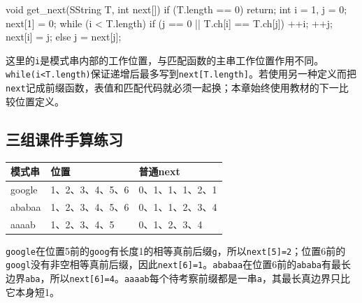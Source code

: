 \par\medskip\noindent\begin{minipage}{\linewidth}
\begin{codeblock}[language=C++]
void get_next(SString T, int next[]) {
    if (T.length == 0) return;
    int i = 1, j = 0;
    next[1] = 0;
    while (i < T.length) {
        if (j == 0 || T.ch[i] == T.ch[j]) {
            ++i; ++j;
            next[i] = j;
        } else {
            j = next[j];
        }
    }
}
\end{codeblock}
\end{minipage}\par\medskip

这里的\texttt{i}是模式串内部的工作位置，与匹配函数的主串工作位置作用不同。\texttt{while(\allowbreak{}i<\allowbreak{}T.\allowbreak{}length)\allowbreak{}}保证递增后最多写到\texttt{next[\allowbreak{}T.\allowbreak{}length]\allowbreak{}}。若使用另一种定义而把\texttt{next}记成前缀函数，表值和匹配代码就必须一起换；本章始终使用教材的下一比较位置定义。

\subsection{三组课件手算练习}\label{DS04-next-practice}

\par\medskip\noindent\begin{minipage}{\linewidth}\fontsize{9.3}{12}\selectfont\begin{tabularx}{\linewidth}{@{}YYY@{}}
\toprule\noalign{}
模式串 & 位置 & 普通next \\
\midrule\noalign{}


google & 1、2、3、4、5、6 & 0、1、1、1、2、1 \\
ababaa & 1、2、3、4、5、6 & 0、1、1、2、3、4 \\
aaaab & 1、2、3、4、5 & 0、1、2、3、4 \\
\bottomrule\end{tabularx}
\end{minipage}\par\medskip

\texttt{google}在位置5前的\texttt{goog}有长度1的相等真前后缀\texttt{g}，所以\texttt{next[\allowbreak{}5]\allowbreak{}=\allowbreak{}2}；位置6前的\texttt{googl}没有非空相等真前后缀，因此\texttt{next[\allowbreak{}6]\allowbreak{}=\allowbreak{}1}。\texttt{ababaa}在位置6前的\texttt{ababa}有最长边界\texttt{aba}，所以\texttt{next[\allowbreak{}6]\allowbreak{}=\allowbreak{}4}。\texttt{aaaab}每个待考察前缀都是一串\texttt{a}，其最长真边界只比它本身短1。

